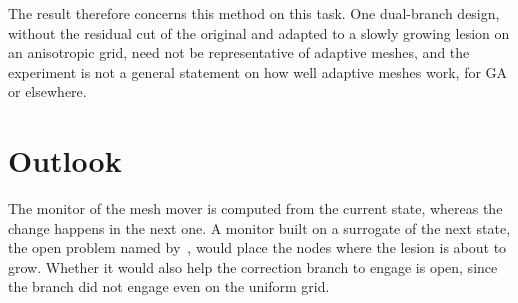 The result therefore concerns this method on this task. One dual-branch
design, without the residual cut of the original and adapted to a slowly
growing lesion on an anisotropic grid, need not
be representative of adaptive meshes, and the experiment is not a general
statement on how well adaptive meshes work, for GA or elsewhere.

\section{Outlook}
\label{app:mm-pde:outlook}

The monitor of the mesh mover is computed from the current state, whereas
the change happens in the next one. A monitor built on a surrogate of the
next state, the open problem named by~\citet{Hu2024}, would place the nodes
where the lesion is about to grow. Whether it would also help the
correction branch to engage is open, since the branch did not engage even
on the uniform grid.



